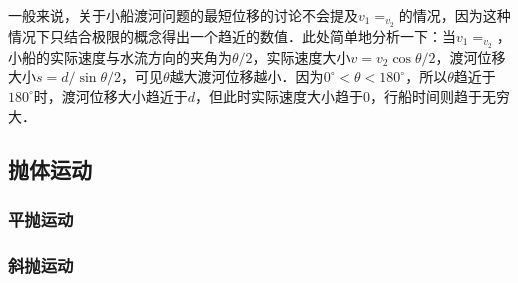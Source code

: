 一般来说，关于小船渡河问题的最短位移的讨论不会提及$v_1=_v_2$的情况，因为这种情况下只结合极限的概念得出一个趋近的数值．此处简单地分析一下：当$v_1=_v_2$，小船的实际速度与水流方向的夹角为$\theta /2$，实际速度大小$v= v_2\cos \theta /2$，渡河位移大小$s= d/\sin \theta /2$，可见$\theta$越大渡河位移越小．因为$0^\circ < \theta < 180^\circ $，所以$\theta$趋近于$180^\circ $时，渡河位移大小趋近于$d$，但此时实际速度大小趋于$0$，行船时间则趋于无穷大．

\subsection{抛体运动}

\subsubsection{平抛运动}

\subsubsection{斜抛运动}
